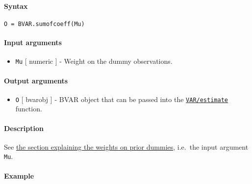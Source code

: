 


	\paragraph{Syntax}

\begin{verbatim}
O = BVAR.sumofcoeff(Mu)
\end{verbatim}

\paragraph{Input arguments}

\begin{itemize}
\itemsep1pt\parskip0pt
\item
  \texttt{Mu} {[} numeric {]} - Weight on the dummy observations.
\end{itemize}

\paragraph{Output arguments}

\begin{itemize}
\itemsep1pt\parskip0pt
\item
  \texttt{O} {[} bvarobj {]} - BVAR object that can be passed into the
  \href{VAR/estimate}{\texttt{VAR/estimate}} function.
\end{itemize}

\paragraph{Description}

See \href{BVAR/Contents}{the section explaining the weights on prior
dummies}, i.e.~the input argument \texttt{Mu}.

\paragraph{Example}


